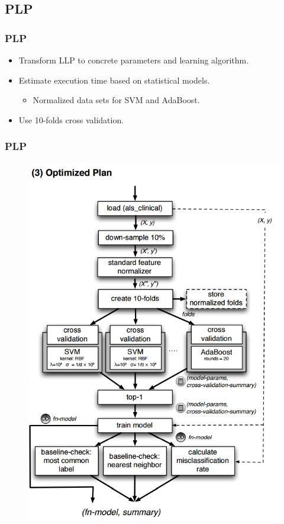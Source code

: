 \subsection{PLP}
\begin{frame}
    \frametitle{PLP}
    \begin{itemize}
		\item Transform LLP to concrete parameters and learning algorithm. 
		\item Estimate execution time based on statistical models. 
			\begin{itemize}
				\item Normalized data sets for SVM and AdaBoost. 
			\end{itemize}
		\item Use 10-folds cross validation. 
	\end{itemize}
\end{frame}

\begin{frame}
    \frametitle{PLP}
    \begin{figure}
		\includegraphics[scale=0.25]{figure/plp.png}
	\end{figure}
\end{frame}

